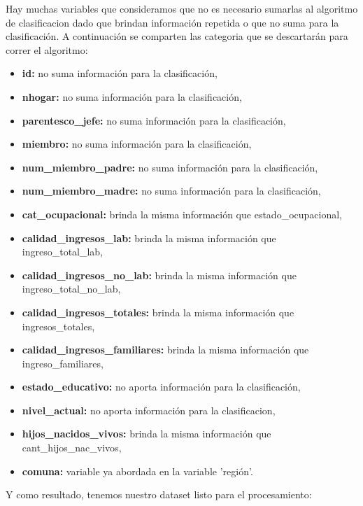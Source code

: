 \documentclass[a4paper]{article}
\begin{document}
        Hay muchas variables que consideramos que no es necesario sumarlas al algoritmo de clasificacion dado que brindan información repetida o que no suma para la clasificación. A continuación se comparten las categoria que se descartarán para correr el algoritmo: 
        \begin{itemize}
            \item \textbf{id:} no suma información para la clasificación,
            \item \textbf{nhogar:} no suma información para la clasificación,
            \item \textbf{parentesco\_jefe:} no suma información para la clasificación,
            \item \textbf{miembro:} no suma información para la clasificación,
            \item \textbf{num\_miembro\_padre:} no suma información para la clasificación,
            \item \textbf{num\_miembro\_madre:} no suma información para la clasificación,
            \item \textbf{cat\_ocupacional:} brinda la misma información que estado\_ocupacional,
            \item \textbf{calidad\_ingresos\_lab:} brinda la misma información que ingreso\_total\_lab,
            \item \textbf{calidad\_ingresos\_no\_lab:} brinda la misma información que ingreso\_total\_no\_lab,
            \item \textbf{calidad\_ingresos\_totales:} brinda la misma información que ingresos\_totales,
            \item \textbf{calidad\_ingresos\_familiares:} brinda la misma información que ingreso\_familiares,
            \item \textbf{estado\_educativo:} no aporta información para la clasificación,
            \item \textbf{nivel\_actual:} no aporta información para la clasificacion,
            \item \textbf{hijos\_nacidos\_vivos:} brinda la misma información que cant\_hijos\_nac\_vivos,
            \item \textbf{comuna:} variable ya abordada en la variable 'región'.
        \end{itemize}

        Y como resultado, tenemos nuestro dataset listo para el procesamiento:
\end{document}
